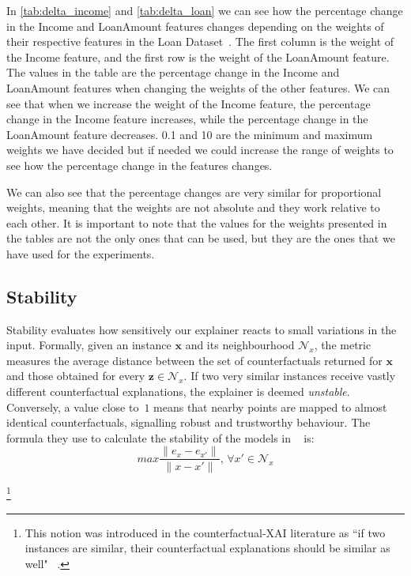 \documentclass[12pt]{extarticle}
\numberwithin{equation}{section}
\begin{document}
In \autoref{tab:delta_income} and \autoref{tab:delta_loan} we can see how the percentage change in the Income and LoanAmount features changes depending on the weights of their respective features in the Loan Dataset~\cite{kaggleLoan1}. The first column is the weight of the Income feature, and the first row is the weight of the LoanAmount feature. The values in the table are the percentage change in the Income and LoanAmount features when changing the weights of the other features. We can see that when we increase the weight of the Income feature, the percentage change in the Income feature increases, while the percentage change in the LoanAmount feature decreases. 0.1 and 10 are the minimum and maximum weights we have decided but if needed we could increase the range of weights to see how the percentage change in the features changes. 

We can also see that the percentage changes are very similar for proportional weights, meaning that the weights are not absolute and they work relative to each other. It is important to note that the values for the weights presented in the tables are not the only ones that can be used, but they are the ones that we have used for the experiments.
    
\subsection{Stability}\label{sec:stability}
Stability evaluates how sensitively our explainer reacts to small variations in the input. Formally, given an instance $\mathbf{x}$ and its neighbourhood $\mathcal{N}_x$, the metric measures the average distance between the set of counterfactuals returned for $\mathbf{x}$ and those obtained for every $\mathbf{z}\!\in\!\mathcal{N}_x$.  If two very similar instances receive vastly different counterfactual explanations, the explainer is deemed \textit{unstable}. Conversely, a value close to~$1$ means that nearby points are mapped to almost identical counterfactuals, signalling robust and trustworthy behaviour. The formula they use to calculate the stability of the models in ~\cite{bodria2023benchmarking} is:
\begin{equation}
    max \frac{\|e_x - e_{x'}\|}{\|x - x'\|},\, {\forall x' \in \mathcal{N}_x}
\end{equation}

\footnote{This notion was introduced in the counterfactual-XAI literature as “if two instances are similar, their counterfactual explanations should be similar as well" ~\cite{bodria2023benchmarking}.}
\end{document}
